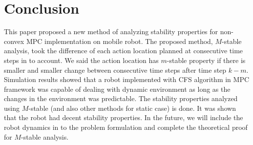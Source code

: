 \documentclass{ifacconf}
\begin{document}
\section{Conclusion}

This paper proposed a new method of analyzing stability properties for non-convex MPC implementation on mobile robot. The proposed method, $M$-stable analysis, took the difference of each action location planned at consecutive time steps in to account. We said the action location has $m$-stable property if there is smaller and smaller change between consecutive time steps after time step $k-m$. Simulation  results showed that a robot implemented with CFS algorithm in MPC framework was capable of dealing with dynamic environment as long as the changes in the environment was predictable. The stability properties analyzed using $M$-stable (and also other methods for static case) is done. It was shown that the robot had decent stability properties. In the future, we will include the robot dynamics in to the problem formulation and complete the theoretical proof for $M$-stable analysis.



\end{document}
